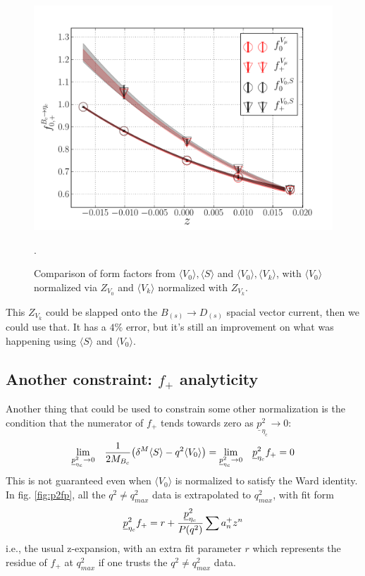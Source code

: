 \begin{figure}[htb!]
\centering
\includegraphics[scale=0.65]{images/NRQCD/Bcetac_bothways_withZVk.pdf}
\caption{Comparison of form factors from $\langle V_0 \rangle, \langle S \rangle$ and $\langle V_0 \rangle,\langle V_k \rangle$, with $\langle V_0 \rangle$ normalized via $Z_{V_0}$ and $\langle V_k \rangle$ normalized with $Z_{V_k}$.}.
\label{fig:ZVk}
\end{figure}
This $Z_{V_k}$ could be slapped onto the $B_{(s)}\to D_{(s)}$ spacial vector current, then we could use that. It has a $4\%$ error, but it's still an improvement on what was happening using $\langle S \rangle$ and $\langle V_0 \rangle$.

\subsection{Another constraint: $f_+$ analyticity}

{}

Another thing that could be used to constrain some other normalization is the condition that the numerator of $f_+$ tends towards zero as $\underline{p}^2_{\eta_c}\to 0$:
\begin{align}
	\displaystyle{\lim_{\underline{p}_{\eta_c}^2\to 0}}\quad {1\over2M_{B_c}}\big( \delta^M  \langle S \rangle - q^2 \langle V_0 \rangle \big) = \displaystyle{\lim_{\underline{p}_{\eta_c}^2\to 0}} \quad \underline{p}^2_{\eta_c}f_+ = 0
\end{align}
This is not guaranteed even when $\langle V_0 \rangle$ is normalized to satisfy the Ward identity. In fig. \ref{fig:p2fp}, all the $q^2\neq q^2_{max}$ data is extrapolated to $q^2_{max}$, with fit form
\begin{align}
	\underline{p}^2_{\eta_c}f_+ = r + {\underline{p}^2_{\eta_c} \over P(q^2)}\sum a^+_n z^n
\end{align}
i.e., the usual z-expansion, with an extra fit parameter $r$ which represents the residue of $f_+$ at $q^2_{max}$ if one trusts the $q^2\neq q^2_{max}$ data.

